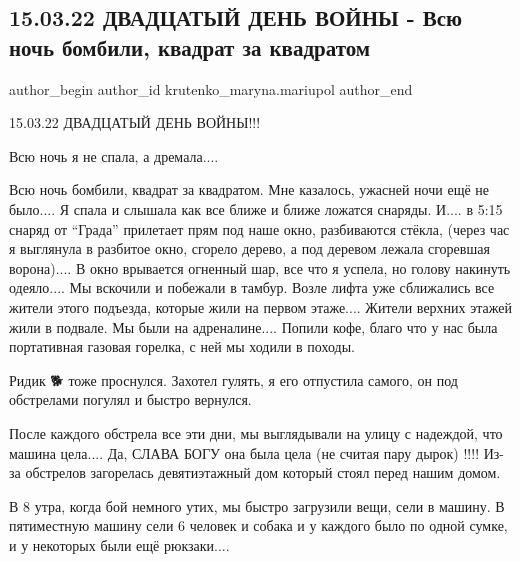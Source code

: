  
 
 
 
 

\subsection{15.03.22 ДВАДЦАТЫЙ ДЕНЬ ВОЙНЫ - Всю ночь бомбили, квадрат за квадратом}
\label{sec:15_03_2023.fb.krutenko_maryna.mariupol.1.15_03_22_dvadtsatii_}

\ifcmt
 author_begin
   author_id krutenko_maryna.mariupol
 author_end
\fi

15.03.22 ДВАДЦАТЫЙ ДЕНЬ ВОЙНЫ!!!

Всю ночь я не спала, а дремала....

Всю ночь бомбили, квадрат за квадратом. Мне казалось, ужасней ночи ещё не
было.... Я спала и слышала как все ближе и ближе ложатся снаряды. И....  в 5:15
снаряд от \enquote{Града} прилетает прям под наше окно, разбиваются стёкла, (через час
я выглянула в разбитое окно, сгорело дерево, а под деревом лежала сгоревшая
ворона).... В окно врывается огненный шар, все что я успела, но голову накинуть
одеяло.... Мы вскочили и побежали в тамбур. Возле лифта уже сближались все жители
этого подъезда, которые жили на первом этаже.... Жители верхних этажей жили в
подвале. Мы были на адреналине.... Попили кофе, благо что у нас была портативная
газовая горелка, с ней мы ходили в походы. 

Ридик 🐕 тоже проснулся. Захотел гулять, я его отпустила самого, он под
обстрелами погулял и быстро вернулся.

После каждого обстрела все эти дни, мы выглядывали на улицу с надеждой, что
машина цела.... Да, СЛАВА БОГУ она была цела (не считая пару дырок) !!!! Из-за
обстрелов загорелась девятиэтажный дом который стоял перед нашим домом. 

В 8 утра, когда бой немного утих, мы быстро загрузили вещи, сели в машину. В
пятиместную машину сели 6 человек и собака и у каждого было по одной сумке, и у
некоторых были ещё рюкзаки....

